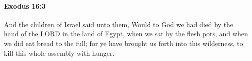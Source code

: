 
		\paragraph{Exodus 16:3} %
			\label{EXODUS-16-3}

			And the children of Israel said unto them, Would to God we had died by the hand of the LORD in the land of Egypt, when we sat by the flesh pots, and when we did eat bread to the full; for ye have brought us forth into this wilderness, to kill this whole assembly with hunger.



